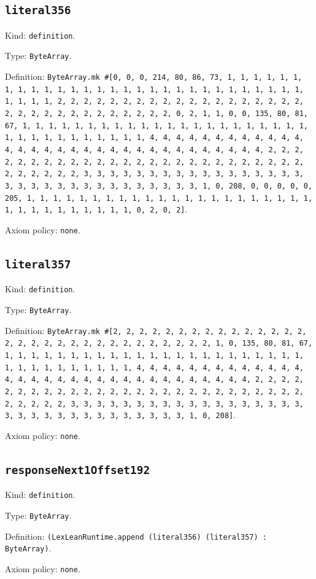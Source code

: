 \documentclass[11pt]{article}
\begin{document}
\subsection*{\texttt{literal356}}
\noindent Kind: \texttt{definition}.\par
\noindent Type: \texttt{ByteArray}.\par
\noindent Definition: \texttt{ByteArray.mk \#[0, 0, 0, 214, 80, 86, 73, 1, 1, 1, 1, 1, 1, 1, 1, 1, 1, 1, 1, 1, 1, 1, 1, 1, 1, 1, 1, 1, 1, 1, 1, 1, 1, 1, 1, 1, 1, 1, 1, 1, 2, 2, 2, 2, 2, 2, 2, 2, 2, 2, 2, 2, 2, 2, 2, 2, 2, 2, 2, 2, 2, 2, 2, 2, 2, 2, 2, 2, 2, 2, 2, 2, 0, 2, 1, 1, 0, 0, 135, 80, 81, 67, 1, 1, 1, 1, 1, 1, 1, 1, 1, 1, 1, 1, 1, 1, 1, 1, 1, 1, 1, 1, 1, 1, 1, 1, 1, 1, 1, 1, 1, 1, 1, 1, 1, 4, 4, 4, 4, 4, 4, 4, 4, 4, 4, 4, 4, 4, 4, 4, 4, 4, 4, 4, 4, 4, 4, 4, 4, 4, 4, 4, 4, 4, 4, 4, 4, 2, 2, 2, 2, 2, 2, 2, 2, 2, 2, 2, 2, 2, 2, 2, 2, 2, 2, 2, 2, 2, 2, 2, 2, 2, 2, 2, 2, 2, 2, 2, 2, 3, 3, 3, 3, 3, 3, 3, 3, 3, 3, 3, 3, 3, 3, 3, 3, 3, 3, 3, 3, 3, 3, 3, 3, 3, 3, 3, 3, 3, 3, 3, 3, 1, 0, 208, 0, 0, 0, 0, 0, 205, 1, 1, 1, 1, 1, 1, 1, 1, 1, 1, 1, 1, 1, 1, 1, 1, 1, 1, 1, 1, 1, 1, 1, 1, 1, 1, 1, 1, 1, 1, 1, 1, 0, 2, 0, 2]}.\par
\noindent Axiom policy: \texttt{none}.\par
\subsection*{\texttt{literal357}}
\noindent Kind: \texttt{definition}.\par
\noindent Type: \texttt{ByteArray}.\par
\noindent Definition: \texttt{ByteArray.mk \#[2, 2, 2, 2, 2, 2, 2, 2, 2, 2, 2, 2, 2, 2, 2, 2, 2, 2, 2, 2, 2, 2, 2, 2, 2, 2, 2, 2, 2, 2, 2, 1, 0, 135, 80, 81, 67, 1, 1, 1, 1, 1, 1, 1, 1, 1, 1, 1, 1, 1, 1, 1, 1, 1, 1, 1, 1, 1, 1, 1, 1, 1, 1, 1, 1, 1, 1, 1, 1, 1, 4, 4, 4, 4, 4, 4, 4, 4, 4, 4, 4, 4, 4, 4, 4, 4, 4, 4, 4, 4, 4, 4, 4, 4, 4, 4, 4, 4, 4, 4, 4, 4, 2, 2, 2, 2, 2, 2, 2, 2, 2, 2, 2, 2, 2, 2, 2, 2, 2, 2, 2, 2, 2, 2, 2, 2, 2, 2, 2, 2, 2, 2, 2, 2, 3, 3, 3, 3, 3, 3, 3, 3, 3, 3, 3, 3, 3, 3, 3, 3, 3, 3, 3, 3, 3, 3, 3, 3, 3, 3, 3, 3, 3, 3, 3, 3, 1, 0, 208]}.\par
\noindent Axiom policy: \texttt{none}.\par
\subsection*{\texttt{responseNext1Offset192}}
\noindent Kind: \texttt{definition}.\par
\noindent Type: \texttt{ByteArray}.\par
\noindent Definition: \texttt{(LexLeanRuntime.append (literal356) (literal357) : ByteArray)}.\par
\noindent Axiom policy: \texttt{none}.\par
\end{document}
